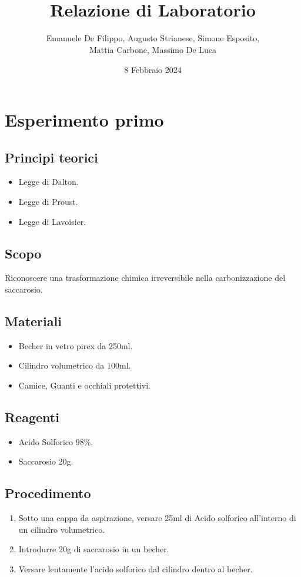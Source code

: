 \documentclass[a4paper,10pt]{article}
\title{\vspace{-4em}{\large Liceo Scientifico T.L. Caro} \\
	Relazione di Laboratorio}
\author{
	Emanuele De Filippo, Augusto Strianese, Simone Esposito, \\
	Mattia Carbone, Massimo De Luca
}
\date{8 Febbraio 2024}
\begin{document}
	
	\maketitle
	
	
	\section{Esperimento primo}
	\subsection{Principi teorici}
	\begin{itemize}
		\item Legge di Dalton.
		\item Legge di Proust.
		\item Legge di Lavoisier.
	\end{itemize}
	\subsection{Scopo}
	
	Riconoscere una trasformazione chimica irreversibile nella carbonizzazione del saccarosio.
	
	\subsection{Materiali}
	\begin{itemize}
		\item{Becher in vetro pirex da 250ml.}
		\item{Cilindro volumetrico da 100ml.}
		\item Camice, Guanti e occhiali protettivi.
	\end{itemize}
	
	
	\subsection{Reagenti}
	\begin{itemize}
		\item{Acido Solforico  98\%.}
		\item{Saccarosio}  20g.
	\end{itemize}
	
	
	\subsection{Procedimento}
	\begin{enumerate}
		\item Sotto una cappa da aspirazione, versare 25ml di Acido solforico all'interno di un cilindro volumetrico.
		\item Introdurre 20g di saccarosio in un becher.
		\item Versare lentamente l'acido solforico dal cilindro dentro al becher.
	\end{enumerate}
\end{document}
